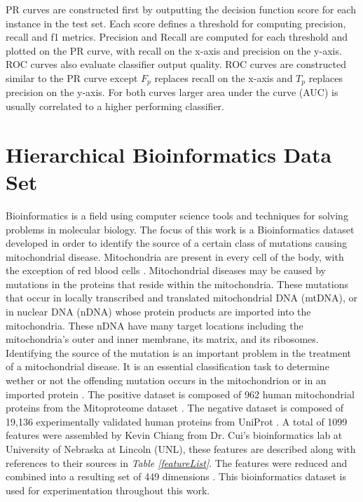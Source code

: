 \documentclass[ms]{nuthesis}
\begin{document}
\par PR curves are constructed first by outputting the decision function score for each instance
in the test set. Each score defines a threshold for computing precision, recall and f1 metrics.
Precision and Recall are computed for each threshold and plotted on the PR curve,
with recall on the x-axis and precision on the y-axis. ROC curves also evaluate classifier output
quality. ROC curves are constructed similar to the PR curve except $F_p$ replaces recall on the
 x-axis and $T_p$ replaces precision on the y-axis. For both curves larger area under the curve
 (AUC) is usually correlated to a higher performing classifier.

\section{Hierarchical Bioinformatics Data Set}
\par Bioinformatics is a field using computer science tools and techniques
for solving problems in molecular biology. The focus of this work is
a Bioinformatics dataset developed in order to identify the source of
a certain class of mutations causing mitochondrial disease. Mitochondria are
present in every cell of the body, with the exception of red blood cells
\cite{bioPoster}. Mitochondrial diseases may be caused by mutations
in the proteins that reside within the mitochondria. These mutations that
occur in locally transcribed and translated mitochondrial DNA (mtDNA), or
in nuclear DNA (nDNA) whose protein products are imported into the
mitochondria. These nDNA have many target locations including the mitochondria's
outer and inner membrane, its matrix, and its ribosomes. Identifying the
source of the mutation is an important problem in the treatment of a
mitochondrial disease. It is an essential classification task to determine
wether or not the offending mutation occurs in the mitochondrion or in
an imported protein \cite{bioPoster}. The positive dataset is composed of 962
human mitochondrial proteins from the Mitoproteome dataset \cite{mitoproteome}.
The negative dataset is composed of 19,136 experimentally validated human
 proteins from UniProt \cite{UniProt}. A total of 1099 features were assembled
 by Kevin Chiang from Dr. Cui's bioinformatics lab at University of Nebraska
 at Lincoln (UNL), these features are described along with references to their
 sources in \textit{Table \ref{featureList}}. The features were reduced and
  combined into a resulting set of 449 dimensions \cite{bioPoster}. This
  bioinformatics dataset is used for experimentation throughout this work.
\end{document}
